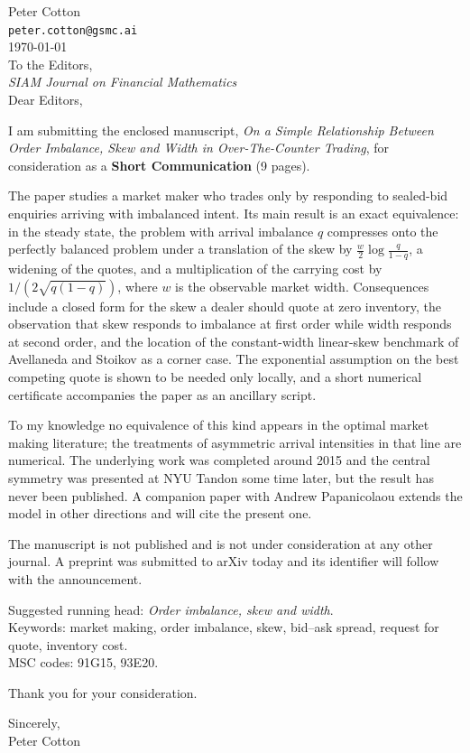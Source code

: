 \documentclass[11pt]{article}
\begin{document}
\noindent Peter Cotton\\
\texttt{peter.cotton@gsmc.ai}\\[2ex]
\today\\[3ex]

\noindent To the Editors,\\
\emph{SIAM Journal on Financial Mathematics}\\[2ex]

\noindent Dear Editors,

\medskip
I am submitting the enclosed manuscript, \emph{On a Simple Relationship Between Order Imbalance, Skew and Width in Over-The-Counter Trading}, for consideration as a \textbf{Short Communication} (9 pages).

The paper studies a market maker who trades only by responding to sealed-bid enquiries arriving with imbalanced intent. Its main result is an exact equivalence: in the steady state, the problem with arrival imbalance $q$ compresses onto the perfectly balanced problem under a translation of the skew by $\tfrac{w}{2}\log\tfrac{q}{1-q}$, a widening of the quotes, and a multiplication of the carrying cost by $1/(2\sqrt{q(1-q)})$, where $w$ is the observable market width. Consequences include a closed form for the skew a dealer should quote at zero inventory, the observation that skew responds to imbalance at first order while width responds at second order, and the location of the constant-width linear-skew benchmark of Avellaneda and Stoikov as a corner case. The exponential assumption on the best competing quote is shown to be needed only locally, and a short numerical certificate accompanies the paper as an ancillary script.

To my knowledge no equivalence of this kind appears in the optimal market making literature; the treatments of asymmetric arrival intensities in that line are numerical. The underlying work was completed around 2015 and the central symmetry was presented at NYU Tandon some time later, but the result has never been published. A companion paper with Andrew Papanicolaou extends the model in other directions and will cite the present one.

The manuscript is not published and is not under consideration at any other journal. A preprint was submitted to arXiv today and its identifier will follow with the announcement.

\medskip
\noindent Suggested running head: \emph{Order imbalance, skew and width}.\\
\noindent Keywords: market making, order imbalance, skew, bid--ask spread, request for quote, inventory cost.\\
\noindent MSC codes: 91G15, 93E20.

\medskip
\noindent Thank you for your consideration.

\bigskip
\noindent Sincerely,\\[1ex]
Peter Cotton
\end{document}
